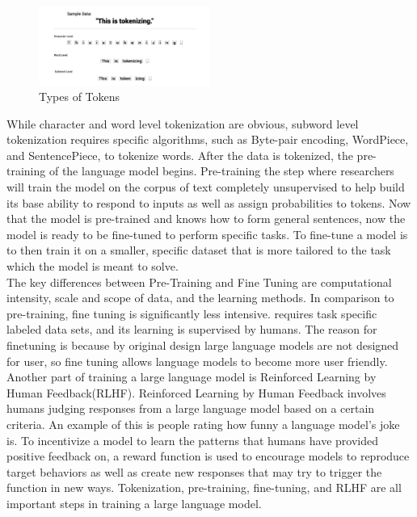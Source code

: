 \documentclass[10pt,twocolumn]{article}
\begin{document}
\begin{figure}[h]
    \centering
    \includegraphics[width=0.5\textwidth]{Images/Tokenizer.png}
    \caption{Types of Tokens}
    \label{fig:example_image}
\end{figure}

While character and word level tokenization are obvious, subword level tokenization requires specific algorithms, such as Byte-pair encoding, WordPiece, and SentencePiece, to tokenize words. After the data is tokenized, the pre-training of the language model begins. Pre-training the step where researchers will train the model on the corpus of text completely unsupervised to help build its base ability to respond to inputs as well as assign probabilities to tokens. Now that the model is pre-trained and knows how to form general sentences, now the model is ready to be fine-tuned to perform specific tasks. To fine-tune a model is to then train it on a smaller, specific dataset that is more tailored to the task which the model is meant to solve. \\ \indent The key differences between Pre-Training and Fine Tuning are computational intensity, scale and scope of data, and the learning methods. In comparison to pre-training, fine tuning is significantly less intensive\cite{noauthor_25_nodate}. requires task specific labeled data sets, and its learning is supervised by humans. The reason for finetuning is because by original design large language models are not designed for user, so fine tuning allows language models to become more user friendly. \\ \indent Another part of training a large language model is Reinforced Learning by Human Feedback(RLHF)\cite{noauthor_what_2024}. Reinforced Learning by Human Feedback involves humans judging responses from a large language model based on a certain criteria. An example of this is people rating how funny a language model’s joke is. To incentivize a model to learn the patterns that humans have provided positive feedback on, a reward function is used to encourage models to reproduce target behaviors as well as create new responses that may try to trigger the function in new ways. Tokenization, pre-training, fine-tuning, and RLHF are all important steps in training a large language model.  
\end{document}
